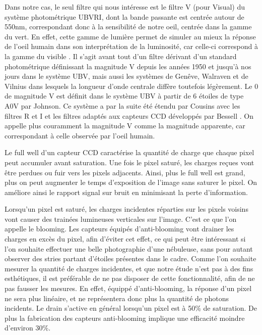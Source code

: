 \documentclass[10pt,french, openany]{book}
\begin{document}
    Dans notre cas, le seul filtre qui nous intéresse est le filtre V (pour Visual) du système photométrique UBVRI, dont la bande passante est centrée autour de 550nm, correspondant donc à la sensibilité de notre oeil, centrée dans la gamme du vert. En effet, cette gamme de lumière permet de simuler au mieux la réponse de l'oeil humain dans son interprétation de la luminosité, car celle-ci correspond à la gamme du visible \cite{cite:griffiths1, site:nsofiltre0, site:nsofiltre1}. Il s'agit avant tout d'un filtre dérivant d'un standard photométrique définissant la magnitude V depuis les années 1950 et jusqu'à nos jours dans le système UBV, mais aussi les systèmes de Genêve, Walraven et de Vilnius dans lesquels la longueur d'onde centrale diffère toutefois légèrement.\cite{book:landolt} Le 0 de magnitude V est définit dans le système UBV à partir de 6 étoiles de type A0V par Johnson\cite{article:johnson}. Ce système a par la suite été étendu par Cousins avec les filtres R et I et les filtres adaptés aux capteurs CCD développés par Bessell  \cite{article:cousin, article:bessell}. On appelle plus couramment la magnitude V comme la magnitude apparente, car correspondant à celle observée par l'oeil humain.
    
    Le full well d'un capteur CCD caractérise la quantité de charge que chaque pixel peut accumuler avant saturation. Une fois le pixel saturé, les charges reçues vont être perdues ou fuir vers les pixels adjacents. Ainsi, plus le full well est grand, plus on peut augmenter le temps d'exposition de l'image sans saturer le pixel. On améliore ainsi le rapport signal sur bruit en minimisant la perte d'information. \cite{manual:sbig, inbook:warner:CCD}
    
    Lorsqu'un pixel est saturé, les charges incidentes réparties sur les pixels voisins vont causer des trainées lumineuses verticales sur l'image. C'est ce que l'on appelle le blooming. Les capteurs équipés d'anti-blooming vont drainer les charges en excès du pixel, afin d'éviter cet effet, ce qui peut être intéressant si l'on souhaite effectuer une belle photographie d'une nébuleuse, sans pour autant observer des stries partant d'étoiles présentes dans le cadre. Comme l'on souhaite mesurer la quantité de charges incidentes, et que notre étude n'est pas à des fins esthétiques, il est préférable de ne pas disposer de cette fonctionnalité, afin de ne pas fausser les mesures. En effet, équippé d'anti-blooming, la réponse d'un pixel ne sera plus linéaire, et ne représentera donc plus la quantité de photons incidents. Le drain s'active en général lorsqu'un pixel est à 50\% de saturation. De plus la fabrication des capteurs anti-blooming implique une efficacité moindre d'environ 30\%. \cite{manual:sbig, inbook:warner:CCD}
    
\end{document}
